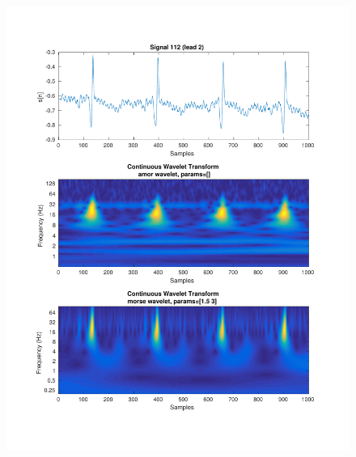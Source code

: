 \documentclass{beamer}
\begin{document}
\begin{frame}
\begin{columns}
\begin{figure}
\includegraphics[width=\textwidth]{fig/112l2_cwt.pdf}
\end{figure}
\end{columns}
\end{frame}
\end{document}
